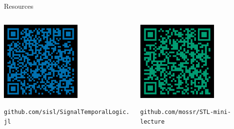 \begin{frame}[fragile]{Resources}

\begin{columns}
    \begin{column}{0.5\textwidth}
        \pause
        \begin{center}
            \includegraphics[width=4cm]{data/stl-qr.png}

            \phantom{}

            \small
            \textcolor{pastelBlue}{\texttt{github.com/sisl/SignalTemporalLogic.jl}}
        \end{center}
    \end{column}
    \begin{column}{0.5\textwidth}
        \pause
        \begin{center}
            \includegraphics[width=4cm]{data/stl-slides-qr.png}

            \phantom{}

            \small
            \textcolor{pastelGreen}{\texttt{github.com/mossr/STL-mini-lecture}}
        \end{center}
    \end{column}
\end{columns}
    
\end{frame}